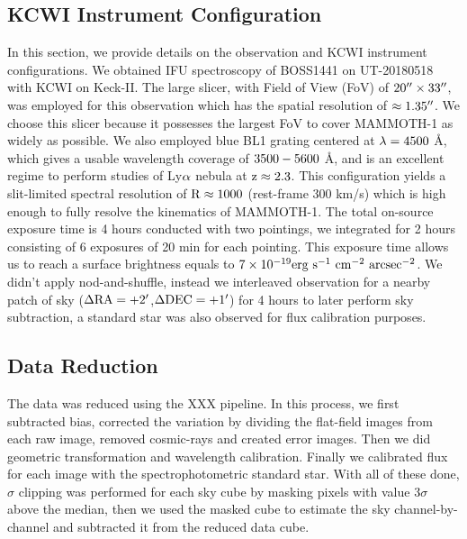 \documentclass[../main.tex]{subfiles}
\begin{document}
\subsection{KCWI Instrument Configuration}
In this section, we provide details on the observation and KCWI instrument configurations. We obtained IFU spectroscopy of BOSS1441 on UT-20180518 with KCWI on Keck-II. The large slicer, with Field of View (FoV) of $\rm 20\mbox{$^{\prime\prime}$} \times 33\mbox{$^{\prime\prime}$}$, was employed for this observation which has the spatial resolution of $\rm \approx 1.35\mbox{$^{\prime\prime}$}$. We choose this slicer because it possesses the largest FoV to cover MAMMOTH-1 as widely as possible. We also employed blue BL1 grating centered at $\rm \lambda=4500$ \AA, which gives a usable wavelength coverage of $\rm 3500-5600$ \AA, and is an excellent regime to perform studies of Ly$\rm \alpha$ nebula at $\rm z\approx 2.3$. This configuration yields a slit-limited spectral resolution of $\rm R \approx 1000$ (rest-frame 300 km/s) which is high enough to fully resolve the kinematics of MAMMOTH-1. The total on-source exposure time is 4 hours conducted with two pointings, we integrated for 2 hours consisting of 6 exposures of 20 min for each pointing. This exposure time allows us to reach a surface brightness equals to $\rm 7\times 10^{-19}\rm erg \ s^{-1} \ cm^{-2} \ arcsec^{-2}$. We didn't apply nod-and-shuffle, instead we interleaved observation for a nearby patch of sky ($\rm \Delta RA=+2\mbox{$^\prime$}$,$\rm \Delta DEC=+1\mbox{$^\prime$}$) for 4 hours to later perform sky subtraction, a standard star was also observed for flux calibration purposes.

\subsection{Data Reduction}
The data was reduced using the XXX pipeline. In this process, we first subtracted bias, corrected the variation by dividing the flat-field images from each raw image, removed cosmic-rays and created error images. Then we did geometric transformation and wavelength calibration. Finally we calibrated flux for each image with the spectrophotometric standard star. With all of these done, $\sigma$ clipping was performed for each sky cube by masking pixels with value $3\sigma$ above the median, then we used the masked cube to estimate the sky channel-by-channel and subtracted it from the reduced data cube. 
 
\end{document}
